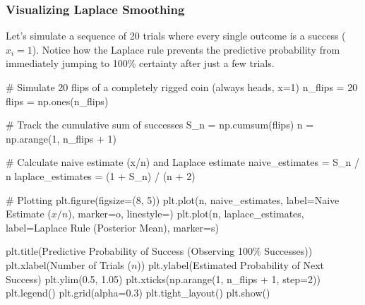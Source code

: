 \documentclass[
  letterpaper,
  DIV=11,
  numbers=noendperiod]{scrartcl}
\newenvironment{Shaded}{\begin{snugshade}}{\end{snugshade}}
\newcommand{\CommentTok}[1]{\textcolor[rgb]{0.37,0.37,0.37}{#1}}
\newcommand{\DecValTok}[1]{\textcolor[rgb]{0.68,0.00,0.00}{#1}}
\newcommand{\FloatTok}[1]{\textcolor[rgb]{0.68,0.00,0.00}{#1}}
\newcommand{\NormalTok}[1]{\textcolor[rgb]{0.00,0.23,0.31}{#1}}
\newcommand{\OperatorTok}[1]{\textcolor[rgb]{0.37,0.37,0.37}{#1}}
\newcommand{\StringTok}[1]{\textcolor[rgb]{0.13,0.47,0.30}{#1}}
\begin{document}
\subsubsection{Visualizing Laplace
Smoothing}\label{visualizing-laplace-smoothing}

Let's simulate a sequence of 20 trials where every single outcome is a
success (\(x_i=1\)). Notice how the Laplace rule prevents the predictive
probability from immediately jumping to 100\% certainty after just a few
trials.

\begin{Shaded}
\begin{Highlighting}[]
\CommentTok{\# Simulate 20 flips of a completely rigged coin (always heads, x=1)}
\NormalTok{n\_flips }\OperatorTok{=} \DecValTok{20}
\NormalTok{flips }\OperatorTok{=}\NormalTok{ np.ones(n\_flips)}

\CommentTok{\# Track the cumulative sum of successes}
\NormalTok{S\_n }\OperatorTok{=}\NormalTok{ np.cumsum(flips)}
\NormalTok{n }\OperatorTok{=}\NormalTok{ np.arange(}\DecValTok{1}\NormalTok{, n\_flips }\OperatorTok{+} \DecValTok{1}\NormalTok{)}

\CommentTok{\# Calculate naive estimate (x/n) and Laplace estimate}
\NormalTok{naive\_estimates }\OperatorTok{=}\NormalTok{ S\_n }\OperatorTok{/}\NormalTok{ n}
\NormalTok{laplace\_estimates }\OperatorTok{=}\NormalTok{ (}\DecValTok{1} \OperatorTok{+}\NormalTok{ S\_n) }\OperatorTok{/}\NormalTok{ (n }\OperatorTok{+} \DecValTok{2}\NormalTok{)}

\CommentTok{\# Plotting}
\NormalTok{plt.figure(figsize}\OperatorTok{=}\NormalTok{(}\DecValTok{8}\NormalTok{, }\DecValTok{5}\NormalTok{))}
\NormalTok{plt.plot(n, naive\_estimates, label}\OperatorTok{=}\StringTok{\textquotesingle{}Naive Estimate ($x/n$)\textquotesingle{}}\NormalTok{, marker}\OperatorTok{=}\StringTok{\textquotesingle{}o\textquotesingle{}}\NormalTok{, linestyle}\OperatorTok{=}\StringTok{\textquotesingle{}{-}{-}\textquotesingle{}}\NormalTok{)}
\NormalTok{plt.plot(n, laplace\_estimates, label}\OperatorTok{=}\StringTok{\textquotesingle{}Laplace Rule (Posterior Mean)\textquotesingle{}}\NormalTok{, marker}\OperatorTok{=}\StringTok{\textquotesingle{}s\textquotesingle{}}\NormalTok{)}

\NormalTok{plt.title(}\StringTok{\textquotesingle{}Predictive Probability of Success (Observing 100\% Successes)\textquotesingle{}}\NormalTok{)}
\NormalTok{plt.xlabel(}\StringTok{\textquotesingle{}Number of Trials ($n$)\textquotesingle{}}\NormalTok{)}
\NormalTok{plt.ylabel(}\StringTok{\textquotesingle{}Estimated Probability of Next Success\textquotesingle{}}\NormalTok{)}
\NormalTok{plt.ylim(}\FloatTok{0.5}\NormalTok{, }\FloatTok{1.05}\NormalTok{)}
\NormalTok{plt.xticks(np.arange(}\DecValTok{1}\NormalTok{, n\_flips }\OperatorTok{+} \DecValTok{1}\NormalTok{, step}\OperatorTok{=}\DecValTok{2}\NormalTok{))}
\NormalTok{plt.legend()}
\NormalTok{plt.grid(alpha}\OperatorTok{=}\FloatTok{0.3}\NormalTok{)}
\NormalTok{plt.tight\_layout()}
\NormalTok{plt.show()}
\end{Highlighting}
\end{Shaded}
\end{document}
